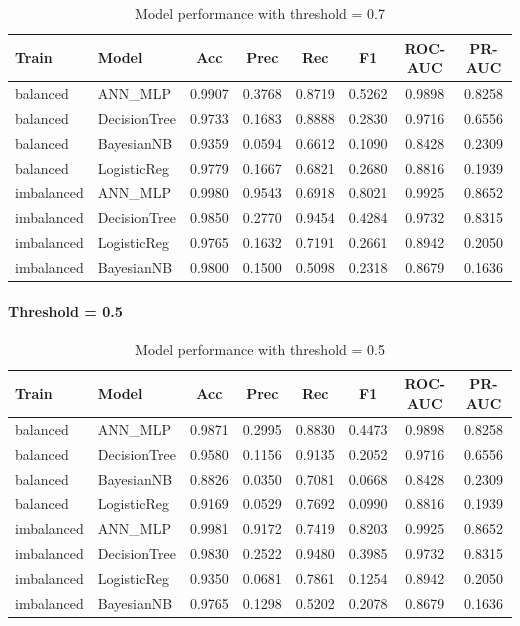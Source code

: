 \begin{table}[H]
\centering
\small
\begin{tabular}{llcccccc}
\hline
Train & Model & Acc & Prec & Rec & F1 & ROC-AUC & PR-AUC \\
\hline
balanced & ANN\_MLP & 0.9907 & 0.3768 & 0.8719 & 0.5262 & 0.9898 & 0.8258 \\
balanced & DecisionTree & 0.9733 & 0.1683 & 0.8888 & 0.2830 & 0.9716 & 0.6556 \\
balanced & BayesianNB & 0.9359 & 0.0594 & 0.6612 & 0.1090 & 0.8428 & 0.2309 \\
balanced & LogisticReg & 0.9779 & 0.1667 & 0.6821 & 0.2680 & 0.8816 & 0.1939 \\
\hline
imbalanced & ANN\_MLP & 0.9980 & 0.9543 & 0.6918 & 0.8021 & 0.9925 & 0.8652 \\
imbalanced & DecisionTree & 0.9850 & 0.2770 & 0.9454 & 0.4284 & 0.9732 & 0.8315 \\
imbalanced & LogisticReg & 0.9765 & 0.1632 & 0.7191 & 0.2661 & 0.8942 & 0.2050 \\
imbalanced & BayesianNB & 0.9800 & 0.1500 & 0.5098 & 0.2318 & 0.8679 & 0.1636 \\
\hline
\end{tabular}
\caption{Model performance with threshold = 0.7}
\end{table}

\paragraph*{Threshold = 0.5}

\begin{table}[H]
\centering
\small
\begin{tabular}{llcccccc}
\hline
Train & Model & Acc & Prec & Rec & F1 & ROC-AUC & PR-AUC \\
\hline
balanced & ANN\_MLP & 0.9871 & 0.2995 & 0.8830 & 0.4473 & 0.9898 & 0.8258 \\
balanced & DecisionTree & 0.9580 & 0.1156 & 0.9135 & 0.2052 & 0.9716 & 0.6556 \\
balanced & BayesianNB & 0.8826 & 0.0350 & 0.7081 & 0.0668 & 0.8428 & 0.2309 \\
balanced & LogisticReg & 0.9169 & 0.0529 & 0.7692 & 0.0990 & 0.8816 & 0.1939 \\
\hline
imbalanced & ANN\_MLP & 0.9981 & 0.9172 & 0.7419 & 0.8203 & 0.9925 & 0.8652 \\
imbalanced & DecisionTree & 0.9830 & 0.2522 & 0.9480 & 0.3985 & 0.9732 & 0.8315 \\
imbalanced & LogisticReg & 0.9350 & 0.0681 & 0.7861 & 0.1254 & 0.8942 & 0.2050 \\
imbalanced & BayesianNB & 0.9765 & 0.1298 & 0.5202 & 0.2078 & 0.8679 & 0.1636 \\
\hline
\end{tabular}
\caption{Model performance with threshold = 0.5}
\end{table}

